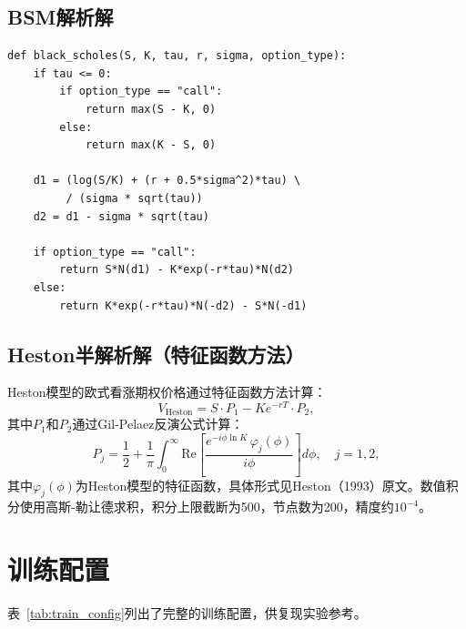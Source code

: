 \subsection{BSM解析解}

\begin{verbatim}
def black_scholes(S, K, tau, r, sigma, option_type):
    if tau <= 0:
        if option_type == "call":
            return max(S - K, 0)
        else:
            return max(K - S, 0)

    d1 = (log(S/K) + (r + 0.5*sigma^2)*tau) \
         / (sigma * sqrt(tau))
    d2 = d1 - sigma * sqrt(tau)

    if option_type == "call":
        return S*N(d1) - K*exp(-r*tau)*N(d2)
    else:
        return K*exp(-r*tau)*N(-d2) - S*N(-d1)
\end{verbatim}

\subsection{Heston半解析解（特征函数方法）}

Heston模型的欧式看涨期权价格通过特征函数方法计算：
\begin{equation}
  V_\text{Heston} = S\cdot P_1 - Ke^{-rT}\cdot P_2,
\end{equation}
其中$P_1$和$P_2$通过Gil-Pelaez反演公式计算：
\begin{equation}
  P_j = \frac{1}{2} + \frac{1}{\pi}\int_0^\infty
    \text{Re}\!\left[\frac{e^{-i\phi\ln K}\,\varphi_j(\phi)}{i\phi}\right]d\phi,
    \quad j=1,2,
\end{equation}
其中$\varphi_j(\phi)$为Heston模型的特征函数，具体形式见Heston（1993）原文。数值积分使用高斯-勒让德求积，积分上限截断为500，节点数为200，精度约$10^{-4}$。

\section{训练配置}

表~\ref{tab:train_config}列出了完整的训练配置，供复现实验参考。

